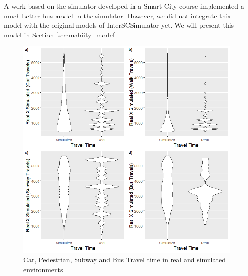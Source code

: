A work based on the simulator developed in a Smart City course implemented a much better bus model to the simulator. However, we did not integrate this model with the original models of InterSCSimulator yet. We will present this model in Section \ref{sec:mobiity_model}.

\begin{figure}[!htb]
\centering
\includegraphics[width=1\textwidth]{figuras/chap-sp/total_modes.png}
\caption{Car, Pedestrian, Subway and Bus Travel time in real and simulated environments}
\label{fig:box_plot_real_simulated_bus_subway}
\end{figure}
